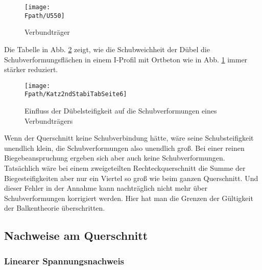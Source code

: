 \begin{figure}[tbp] \centering
\centering
\if {} \sidecaption[t] \fi
\texttt{[image: \\Fpath/U550]}
\caption{Verbundtr\"{a}ger} \label{U550}
\end{figure}%
Die Tabelle in Abb. \ref{Katz2ndStabiTabSeite6} zeigt, wie die Schubweichheit der D\"{u}bel die Schubverformungsfl\"{a}chen in einem I-Profil mit Ortbeton wie in Abb. \ref{U550} immer st\"{a}rker reduziert.
\begin{figure}[tbp] \centering
\centering
\if {} \sidecaption[t] \fi
\texttt{[image: \\Fpath/Katz2ndStabiTabSeite6]}
\caption{Einfluss der D\"{u}belsteifigkeit auf die Schubverformungen eines Verbundtr\"{a}gers} \label{Katz2ndStabiTabSeite6}
\end{figure}%

Wenn der Querschnitt keine Schubverbindung h\"{a}tte, w\"{a}re seine Schubsteifigkeit unendlich klein, die Schubverformungen also unendlich gro{\ss}. Bei einer reinen Biegebeanspruchung ergeben sich aber auch keine Schubverformungen. Tats\"{a}chlich w\"{a}re bei einem zweigeteilten Rechteckquerschnitt die Summe der Biegesteifigkeiten aber nur ein Viertel so gro{\ss} wie beim ganzen Querschnitt. Und dieser Fehler in der Annahme kann nachtr\"{a}glich nicht mehr \"{u}ber Schubverformungen korrigiert werden. Hier hat man die Grenzen der G\"{u}ltigkeit der Balkentheorie \"{u}berschritten.

{\textcolor{sectionTitleBlue}{\subsection{Nachweise am Querschnitt }}}
\vspace{-0.5cm}
{\textcolor{sectionTitleBlue}{\subsubsection*{Linearer Spannungsnachweis }}}

